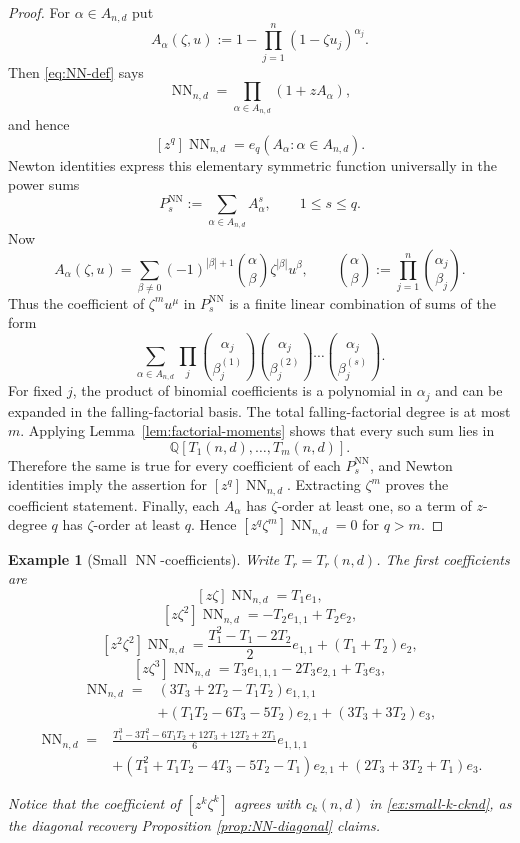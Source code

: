 \documentclass[10pt,a4paper]{amsart}
\numberwithin{equation}{section}
\newtheorem{example}[theorem]{Example}
\newcommand{\Q}{\mathbb Q}
\newcommand{\NN}{\operatorname{NN}}
\begin{document}
\begin{proof}
For $\alpha\in A_{n,d}$ put
\[
  A_\alpha(\zeta,u):=1-\prod_{j=1}^n(1-\zeta u_j)^{\alpha_j}.
\]
Then \eqref{eq:NN-def} says
\[
  \NN_{n,d}=\prod_{\alpha\in A_{n,d}}(1+zA_\alpha),
\]
and hence
\[
  [z^q]\NN_{n,d}=e_q(A_\alpha:\alpha\in A_{n,d}).
\]
Newton identities express this elementary symmetric function universally in the power sums
\[
  P_s^{\NN}:=\sum_{\alpha\in A_{n,d}}A_\alpha^s,
  \qquad 1\le s\le q.
\]
Now
\[
  A_\alpha(\zeta,u)=
  \sum_{\beta\ne0}(-1)^{|\beta|+1}
  \binom{\alpha}{\beta}\zeta^{|\beta|}u^\beta,
  \qquad
  \binom{\alpha}{\beta}:=\prod_{j=1}^n\binom{\alpha_j}{\beta_j}.
\]
Thus the coefficient of $\zeta^m u^\mu$ in $P_s^{\NN}$ is a finite linear combination of sums of the form
\[
  \sum_{\alpha\in A_{n,d}}
  \prod_j
  \binom{\alpha_j}{\beta_j^{(1)}}
  \binom{\alpha_j}{\beta_j^{(2)}}\cdots
  \binom{\alpha_j}{\beta_j^{(s)}}.
\]
For fixed $j$, the product of binomial coefficients is a polynomial in $\alpha_j$ and can be expanded in the falling-factorial basis.  The total falling-factorial degree is at most $m$.  Applying Lemma~\ref{lem:factorial-moments} shows that every such sum lies in
\[
  \Q[T_1(n,d),\ldots,T_m(n,d)].
\]
Therefore the same is true for every coefficient of each $P_s^{\NN}$, and Newton identities imply the assertion for $[z^q]\NN_{n,d}$.  Extracting $\zeta^m$ proves the coefficient statement.  Finally, each $A_\alpha$ has $\zeta$-order at least one, so a term of $z$-degree $q$ has $\zeta$-order at least $q$.  Hence $[z^q\zeta^m]\NN_{n,d}=0$ for $q>m$.
\end{proof}




\begin{example}[Small $\NN$-coefficients]\label{ex:NN-small}
Write $T_r=T_r(n,d)$.  The first coefficients are
\[
  [z\zeta]\NN_{n,d}=T_1e_1,
\]
\[
  [z\zeta^2]\NN_{n,d}=-T_2e_{1,1}+T_2e_2,
\]
\[
  [z^2\zeta^2]\NN_{n,d}=
  \frac{T_1^2-T_1-2T_2}{2}e_{1,1}+(T_1+T_2)e_2,
\]
\[
  [z\zeta^3]\NN_{n,d}=T_3e_{1,1,1}-2T_3e_{2,1}+T_3e_3,
\]
\begin{align*}
  [z^2\zeta^3]\NN_{n,d}={}&
  (3T_3+2T_2-T_1T_2)e_{1,1,1}\\
  &+(T_1T_2-6T_3-5T_2)e_{2,1}
  +(3T_3+3T_2)e_3,
\end{align*}
\begin{align*}
  [z^3\zeta^3]\NN_{n,d}={}&
  \frac{T_1^3-3T_1^2-6T_1T_2+12T_3+12T_2+2T_1}{6}e_{1,1,1}\\
  &+(T_1^2+T_1T_2-4T_3-5T_2-T_1)e_{2,1}
  +(2T_3+3T_2+T_1)e_3.
\end{align*}

Notice that the coefficient of $[z^k\zeta^k]$ agrees with $c_k(n,d)$ in \ref{ex:small-k-cknd}, as the diagonal recovery Proposition \ref{prop:NN-diagonal} claims.
\end{example}
\end{document}
